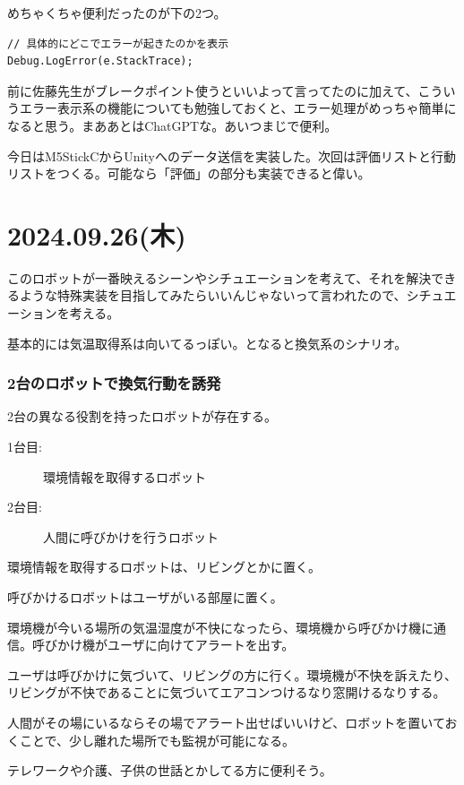 \documentclass[fleqn,twocolumn]{mynote}
\begin{document}
  めちゃくちゃ便利だったのが下の2つ。

  \begin{lstlisting}[caption=Unityのエラー表示,label=code:error-output]
// 具体的にどこでエラーが起きたのかを表示
Debug.LogError(e.StackTrace);
  \end{lstlisting}

  前に佐藤先生がブレークポイント使うといいよって言ってたのに加えて、こういうエラー表示系の機能についても勉強しておくと、エラー処理がめっちゃ簡単になると思う。まああとはChatGPTな。あいつまじで便利。

  今日はM5StickCからUnityへのデータ送信を実装した。次回は評価リストと行動リストをつくる。可能なら「評価」の部分も実装できると偉い。

  \section*{2024.09.26(木)}
  このロボットが一番映えるシーンやシチュエーションを考えて、それを解決できるような特殊実装を目指してみたらいいんじゃないって言われたので、シチュエーションを考える。

  基本的には気温取得系は向いてるっぽい。となると換気系のシナリオ。

  \subsubsection*{2台のロボットで換気行動を誘発}
  2台の異なる役割を持ったロボットが存在する。
  \begin{description}
    \item[1台目:]環境情報を取得するロボット
    \item[2台目:]人間に呼びかけを行うロボット
  \end{description}

  環境情報を取得するロボットは、リビングとかに置く。

  呼びかけるロボットはユーザがいる部屋に置く。

  環境機が今いる場所の気温湿度が不快になったら、環境機から呼びかけ機に通信。呼びかけ機がユーザに向けてアラートを出す。

  ユーザは呼びかけに気づいて、リビングの方に行く。環境機が不快を訴えたり、リビングが不快であることに気づいてエアコンつけるなり窓開けるなりする。

  人間がその場にいるならその場でアラート出せばいいけど、ロボットを置いておくことで、少し離れた場所でも監視が可能になる。

  テレワークや介護、子供の世話とかしてる方に便利そう。
\end{document}
